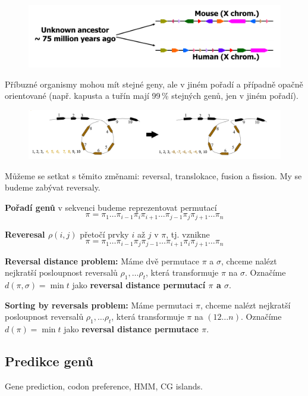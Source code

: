 \documentclass[11pt]{report} %
\numberwithin{equation}{section}
\begin{document}
\begin{figure}[H]
	\centering
	\includegraphics[scale=1]{img/genome_rearr.png}
\end{figure}

Příbuzné organismy mohou mít stejné geny, ale v jiném pořadí a případně opačně orientované (např. kapusta a tuřín mají 99\,\% stejných genů, jen v jiném pořadí). 

\begin{figure}[H]
	\centering
	\includegraphics[width=\textwidth]{img/genome_rearr2.png}
\end{figure}

Můžeme se setkat s těmito změnami: reversal, translokace, fusion a fission. My se budeme zabývat reversaly.

\textbf{Pořadí genů} v sekvenci budeme reprezentovat permutací $$\pi = \pi_1 \dots \pi_{i-1} \pi_{i} \pi_{i+1} \dots \pi_{j-1} \pi_{j} \pi_{j+1} \dots \pi_{n}$$

\textbf{Reveresal $\rho(i,j)$} přetočí prvky $i$ až $j$ v $\pi$, tj. vznikne 
$$\pi = \pi_1 \dots \pi_{i-1} \pi_{j} \pi_{j-1} \dots \pi_{i+1} \pi_{i} \pi_{j+1} \dots \pi_{n}$$

\textbf{Reversal distance problem:} Máme dvě permutace $\pi$ a $\sigma$, chceme nalézt nejkratší posloupnost reversalů $\rho_1,\dots \rho_t$, která transformuje $\pi$ na $\sigma$. Označíme $d(\pi, \sigma) = \min t$ jako \textbf{reversal distance permutací $\pi$ a $\sigma$}.

\textbf{Sorting by reversals problem:} Máme permutaci $\pi$, chceme nalézt nejkratší posloupnost reversalů $\rho_1,\dots \rho_t$, která transformuje $\pi$ na $(1 2 \dots n)$. Označíme $d(\pi) = \min t$ jako \textbf{reversal distance permutace $\pi$}.

\subsection{Predikce genů}
Gene prediction, codon preference, HMM, CG islands.
\end{document}
